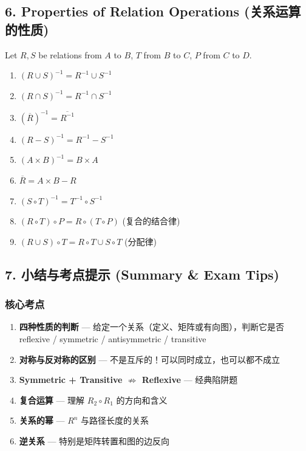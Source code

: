 \documentclass[10pt,a4paper,openany]{ctexbook}
\theoremstyle{definition}
\theoremstyle{remark}
\begin{document}
\subsection{6. Properties of Relation Operations (关系运算的性质)}

Let $R, S$ be relations from $A$ to $B$, $T$ from $B$ to $C$, $P$ from $C$ to $D$.
\begin{enumerate}
\item $(R \cup S)^{-1} = R^{-1} \cup S^{-1}$
\item $(R \cap S)^{-1} = R^{-1} \cap S^{-1}$
\item $(\overline{R})^{-1} = \overline{R^{-1}}$
\item $(R - S)^{-1} = R^{-1} - S^{-1}$
\item $(A \times B)^{-1} = B \times A$
\item $\overline{R} = A \times B - R$
\item $(S \circ T)^{-1} = T^{-1} \circ S^{-1}$
\item $(R \circ T) \circ P = R \circ (T \circ P)$ (复合的结合律)
\item $(R \cup S) \circ T = R \circ T \cup S \circ T$ (分配律)

\end{enumerate}

\vspace{-2pt}

\subsection{7. 小结与考点提示 (Summary \& Exam Tips)}

\subsubsection{核心考点}

\begin{enumerate}
\item \textbf{四种性质的判断} — 给定一个关系（定义、矩阵或有向图），判断它是否 reflexive / symmetric / antisymmetric / transitive
\item \textbf{对称与反对称的区别} — 不是互斥的！可以同时成立，也可以都不成立
\item \textbf{Symmetric + Transitive $\not\Rightarrow$ Reflexive} — 经典陷阱题
\item \textbf{复合运算} — 理解 $R_2 \circ R_1$ 的方向和含义
\item \textbf{关系的幂} — $R^n$ 与路径长度的关系
\item \textbf{逆关系} — 特别是矩阵转置和图的边反向

\end{enumerate}
\end{document}
